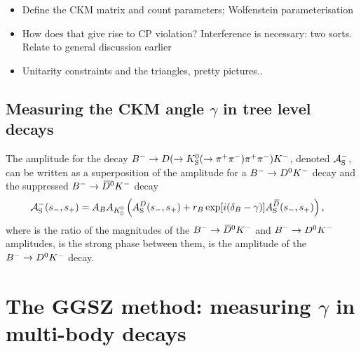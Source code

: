 \begin{itemize}
    \item Define the CKM matrix and count parameters; Wolfenstein parameterisation
    \item How does that give rise to CP violation? Interference is necessary: two sorts. Relate to general discussion earlier
    \item Unitarity constraints and the triangles, pretty pictures..
\end{itemize}



\subsection{\texorpdfstring{Measuring the CKM angle $\gamma$ in tree level decays}{Measuring gamma in tree level decays}} %
\label{sub:_measuring_gamma_in_tree_level_decays}

The amplitude for the decay ${{{B}^-}}\rightarrow{\ensuremath{D}}(\rightarrow{\ensuremath{{K}^0_{\mathrm{S}}}}(\rightarrow {\ensuremath{{\pi}^+}}{\ensuremath{{\pi}^-}}) \pi^+ \pi^-){{K}^-}$, denoted $\mathcal{A}_{\rm S}^-$, can be written as a superposition of the amplitude for a ${{{B}^-}}\rightarrow{\ensuremath{{D}^0}}{\ensuremath{{K}^-}}$ decay and the suppressed ${{{B}^-}}\rightarrow{\ensuremath{{\kern 0.18em\overline{\kern -0.18em D}}{}^0}}{\ensuremath{{K}^-}}$ decay
\begin{align} \label{eq:A_Bminus}
    \mathcal{A}_{\rm S}^-(s_-, s_+)
    &= A_{B} A_{{{K}^0_{\mathrm{S}}}} \left(A_{\rm S}^{D}(s_-,s_+) + r_{B} \exp[i(\delta_{B} - \gamma)]A_{\rm S}^{{\kern 0.18em\overline{\kern -0.18em D}}}(s_-,s_+)\right),
\end{align}
where \rB is the ratio of the magnitudes of the ${{{B}^-}}\rightarrow{\ensuremath{{\kern 0.18em\overline{\kern -0.18em D}}{}^0}}{\ensuremath{{K}^-}}$ and ${{{B}^-}}\rightarrow{\ensuremath{{D}^0}}{\ensuremath{{K}^-}}$ amplitudes, \dB is the strong phase between them, \AB is the amplitude of the ${{{B}^-}}\rightarrow{\ensuremath{{D}^0}}{\ensuremath{{K}^-}}$ decay.


\section{\texorpdfstring{The GGSZ method: measuring $\gamma$ in multi-body \D decays}{The GGSZ method: measuring gamma in multi-body D decays}} %
\label{sec:the_ggsz_method}

